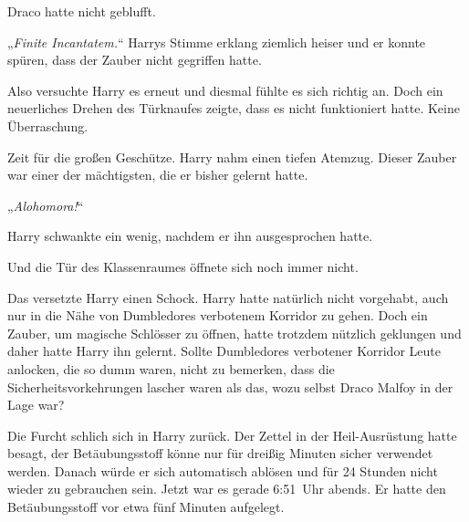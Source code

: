Draco hatte nicht geblufft.

„\emph{Finite Incantatem.}“ Harrys Stimme erklang ziemlich heiser und er konnte spüren, dass der Zauber nicht gegriffen hatte.

Also versuchte Harry es erneut und diesmal fühlte es sich richtig an. Doch ein neuerliches Drehen des Türknaufes zeigte, dass es nicht funktioniert hatte. Keine Überraschung.

Zeit für die großen Geschütze. Harry nahm einen tiefen Atemzug. Dieser Zauber war einer der mächtigsten, die er bisher gelernt hatte.

„\emph{Alohomora!}“

Harry schwankte ein wenig, nachdem er ihn ausgesprochen hatte.

Und die Tür des Klassenraumes öffnete sich noch immer nicht.

Das versetzte Harry einen Schock. Harry hatte natürlich nicht vorgehabt, auch nur in die Nähe von Dumbledores verbotenem Korridor zu gehen. Doch ein Zauber, um magische Schlösser zu öffnen, hatte trotzdem nützlich geklungen und daher hatte Harry ihn gelernt. Sollte Dumbledores verbotener Korridor Leute anlocken, die so dumm waren, nicht zu bemerken, dass die Sicherheitsvorkehrungen lascher waren als das, wozu selbst Draco Malfoy in der Lage war?

Die Furcht schlich sich in Harry zurück. Der Zettel in der Heil-Ausrüstung hatte besagt, der Betäubungsstoff könne nur für dreißig Minuten sicher verwendet werden. Danach würde er sich automatisch ablösen und für 24 Stunden nicht wieder zu gebrauchen sein. Jetzt war es gerade 6:51~Uhr abends. Er hatte den Betäubungsstoff vor etwa fünf Minuten aufgelegt.


